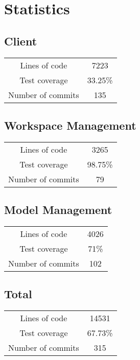 \section{Statistics}
\subsection{Client}
\begin{tabular}{ c|c } 
    Lines of code & 7223 \\ 
    Test coverage & 33.25\% \\ 
    Number of commits & 135 \\ 
\end{tabular}

\subsection{Workspace Management}
\begin{tabular}{ c|c } 
    Lines of code & 3265 \\ 
    Test coverage & 98.75\% \\ 
    Number of commits & 79 \\ 
\end{tabular}

\subsection{Model Management}
\begin{tabular}{ c|c } 
    Lines of code & 4026 \\ 
    Test coverage & 71\% \\ 
    Number of commits & 102 \\ 
\end{tabular}

\subsection{Total}
\begin{tabular}{ c|c } 
    Lines of code & 14531 \\ 
    Test coverage & 67.73\% \\ 
    Number of commits & 315 \\ 
\end{tabular}
